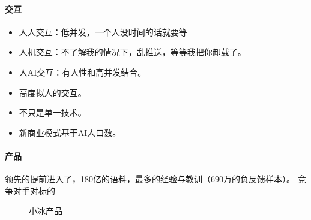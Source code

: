 \documentclass[letterpaper,11pt,english]{sphinxmanual}
\begin{document}
\paragraph{交互}
\label{\detokenize{chapter_company/xiaoice:id12}}\begin{itemize}
\item {} 
人人交互：低并发，一个人没时间的话就要等

\item {} 
人机交互：不了解我的情况下，乱推送，等等我把你卸载了。

\item {} 
人AI交互：有人性和高并发结合。

\item {} 
高度拟人的交互。

\item {} 
不只是单一技术。

\item {} 
新商业模式基于AI人口数。%
\begin{footnote}[940]\sphinxAtStartFootnote
{}
%
\end{footnote}

\end{itemize}


\paragraph{产品}
\label{\detokenize{chapter_company/xiaoice:id13}}
领先的提前进入了，180亿的语料，最多的经验与教训（690万的负反馈样本）。
竞争对手对标的

\begin{figure}[H]
\centering
\capstart

\noindent{}
\caption{小冰产品}\label{\detokenize{chapter_company/xiaoice:id25}}\end{figure}
\end{document}
